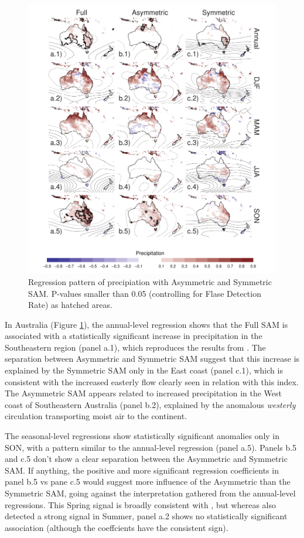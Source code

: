 \documentclass[]{ametsocV5}
\begin{document}
\begin{figure}
\includegraphics{pp-regr-oceania-1} \caption[Regression pattern of precipiation with Asymmetric and Symmetric SAM]{Regression pattern of precipiation with Asymmetric and Symmetric SAM. P-values smaller than 0.05 (controlling for Flase Detection Rate) as hatched areas.}\label{fig:pp-regr-oceania}
\end{figure}

In Australia (Figure \ref{fig:pp-regr-oceania}), the annual-level
regression shows that the Full SAM is associated with a statistically
significant increase in precipitation in the Southeastern region (panel
a.1), which reproduces the results from \citet{gillett2006}. The
separation between Asymmetric and Symmetric SAM suggest that this
increase is explained by the Symmetric SAM only in the East coast (panel
c.1), which is consistent with the increased easterly flow clearly seen
in relation with this index. The Asymmetric SAM appears related to
increased precipitation in the West coast of Southeastern Australia
(panel b.2), explained by the anomalous \emph{westerly} circulation
transporting moist air to the continent.

The seasonal-level regressions show statistically significant anomalies
only in SON, with a pattern similar to the annual-level regression
(panel a.5). Panels b.5 and c.5 don't show a clear separation between
the Asymmetric and Symmetric SAM. If anything, the positive and more
significant regression coefficients in panel b.5 vs pane c.5 would
suggest more influence of the Asymmetric than the Symmetric SAM, going
against the interpretation gathered from the annual-level regressions.
This Spring signal is broadly consistent with \citet{hendon2007}, but
whereas \citet{hendon2007} also detected a strong signal in Summer,
panel a.2 shows no statistically significant association (although the
coeffcients have the consistent sign).
\end{document}
